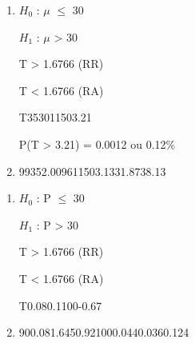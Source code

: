 
\begin{question}
    
    \begin{enumerate}[label={\textbf{\alph*)}}]
        
        \item 
        
            $H_0$ : $\mu$ $\leq$ 30 

            $H_1$ : $\mu$ > 30 
        
            T > 1.6766 (RR)

            T < 1.6766 (RA)

            \begin{formula7}
                {T}{35}{30}{11}{50}{3.21}
            \end{formula7}

            P(T > 3.21) = 0.0012 ou 0.12\%

        \item 
    
            \begin{formula2}
                {99}{35}{2.0096}{11}{50}{3.13}{31.87}{38.13}
            \end{formula2}

    \end{enumerate}
\end{question}


\begin{question}
    
    \begin{enumerate}[label={\textbf{\alph*)}}]
        
        \item 
        
            $H_0$ : P $\leq$ 30 

            $H_1$ : P > 30 
        
            T > 1.6766 (RR)

            T < 1.6766 (RA)

            \begin{formula8}
                {T}{0.08}{0.1}{}{100}{-0.67}
            \end{formula8}

        \item 
    
            \begin{formula3}
                {90}{0.08}{1.645}{0.92}{100}{0.044}{0.036}{0.124}
            \end{formula3}

    \end{enumerate}
\end{question}

